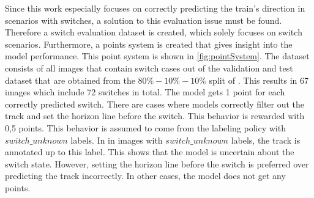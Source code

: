 \noindent Since this work especially focuses on correctly predicting the train's direction in scenarios with switches, a solution to this evaluation issue must be found.
Therefore a switch evaluation dataset is created, which solely focuses on switch scenarios.
Furthermore, a points system is created that gives insight into the model performance.
This point system is shown in \autoref{fig:pointSystem}.
The dataset consists of all images that contain switch cases out of the validation and test dataset that are obtained from the $80\%-10\%-10\%$ split of \cite{tepNet2024}.
This results in 67 images which include 72 switches in total.
The model gets 1 point for each correctly predicted switch.
There are cases where models correctly filter out the track and set the horizon line before the switch.
This behavior is rewarded with 0,5 points.
This behavior is assumed to come from the labeling policy with $switch\_unknown$ labels.
In \cite{tepNet2024} in images with $switch\_unknown$ labels, the track is annotated up to this label.
This shows that the model is uncertain about the switch state.
However, setting the horizon line before the switch is preferred over predicting the track incorrectly.
In other cases, the model does not get any points.

